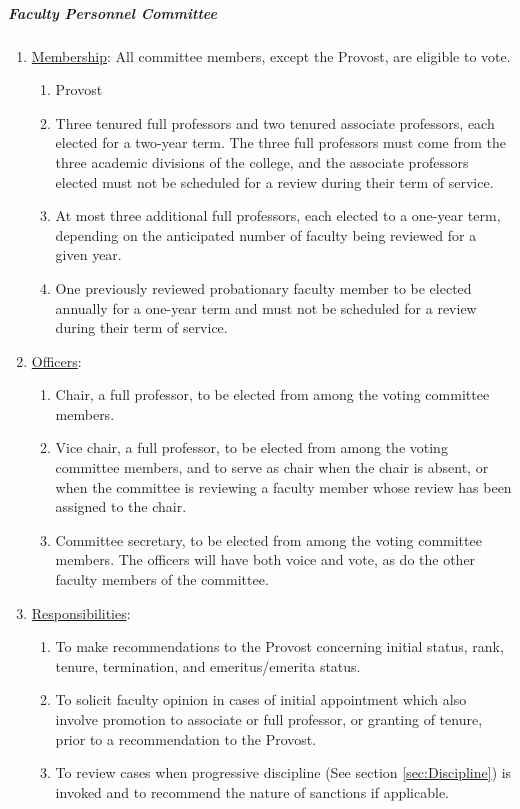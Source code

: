 				\subparagraph{Faculty Personnel Committee}
					\begin{enumerate}[label=\alph*)]
						\item{\underline{Membership}:
							All committee members, except the Provost, are eligible to vote.
							\begin{enumerate}[label=\arabic*)]
								\item{Provost}
								\item{Three tenured full professors and two tenured associate professors, each elected for a two-year term.  The three full professors must come from the three academic divisions of the college, and the associate professors elected must not be scheduled for a review during their term of service.}
								\item{At most three additional full professors, each elected to a one-year term, depending on the anticipated number of faculty being reviewed for a given year.}
								\item{One previously reviewed probationary faculty member to be elected annually for a one-year term and must not be scheduled for a review during their term of service.}

							\end{enumerate}
						}
						\item{\underline{Officers}:
							\begin{enumerate}[label=\arabic*)]
								\item{Chair, a full professor, to be elected from among the voting committee members.}
								\item{Vice chair, a full professor, to be elected from among the voting committee members, and to serve as chair when the chair is absent, or when the committee is reviewing a faculty member whose review has been assigned to the chair.}
								\item{Committee secretary, to be elected from among the voting committee members.  The officers will have both voice and vote, as do the other faculty members of the committee.}
							\end{enumerate}
						}
						\item{\underline{Responsibilities}:
							\begin{enumerate}[label=\arabic*)]
								\item{To make recommendations to the Provost concerning initial status, rank, tenure, termination, and emeritus/emerita status.}
								\item{To solicit faculty opinion in cases of initial appointment which also involve promotion to associate or full professor, or granting of tenure, prior to a recommendation to the Provost.}
								\item{To review cases when progressive discipline (See section \ref{sec:Discipline}) is invoked and to recommend the nature of sanctions if applicable.}
							\end{enumerate}
						}
					\end{enumerate}
